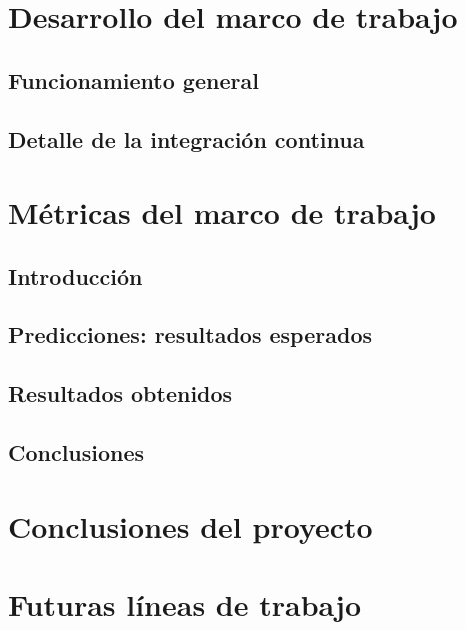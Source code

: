 \documentclass[
  a4paper,  %
  twoside,  %
  bibliography=totoc,
  headsepline,
  cleardoublepage=empty,
  parskip=half,
  draft=false
]{scrbook}
\begin{document}
\chapter{Desarrollo del marco de trabajo}



\label{chap:development}
\section{Funcionamiento general}



\section{Detalle de la integración continua}
\label{chap:ci-cd-detail}





\chapter{Métricas del marco de trabajo}
\label{chap:metrics}

\section{Introducción}


\section{Predicciones: resultados esperados}


\section{Resultados obtenidos}


\section{Conclusiones}




\chapter{Conclusiones del proyecto}




\chapter{Futuras líneas de trabajo}
\label{chap:further-steps}
\end{document}
